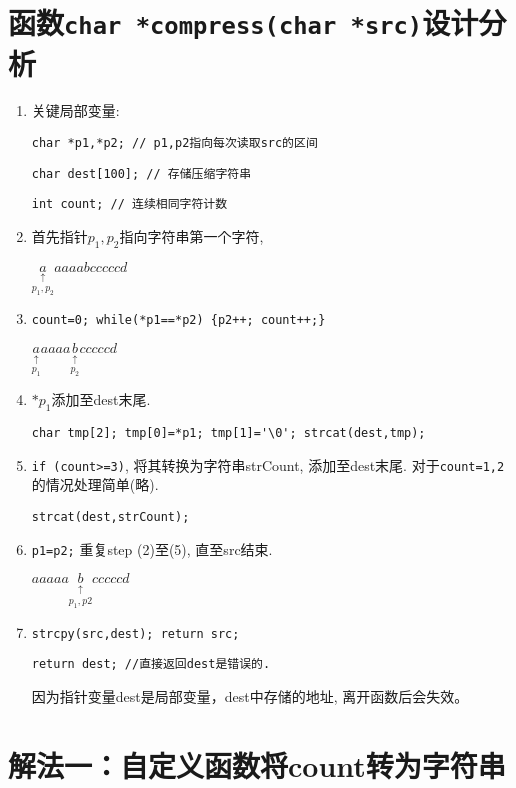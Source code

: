 \section{函数\lstinline|char *compress(char *src)|设计分析}

\begin{enumerate}[(1)]
	\item 关键局部变量:
	
	 \lstinline|char *p1,*p2; // p1,p2指向每次读取src的区间| 
	
	 \lstinline|char dest[100]; // 存储压缩字符串| 
	 
	 \lstinline|int count; // 连续相同字符计数| 
	
	\item 首先指针$p_1,p_2$指向字符串第一个字符, 
	
	$\underset{p_1,p_2}{\underset{\uparrow}{a}}aaaabcccccd$
	
	\item \lstinline|count=0; while(*p1==*p2) {p2++; count++;}|
	
	$\underset{p_1}{\underset{\uparrow}{a}}aaaa\underset{p_2}{\underset{\uparrow}{b}}cccccd$
	
	\item $*p_1$添加至dest末尾.
	
	\lstinline|char tmp[2]; tmp[0]=*p1; tmp[1]='\0'; strcat(dest,tmp);|
	
	\item \lstinline|if (count>=3)|, 将其转换为字符串strCount, 添加至dest末尾. 对于\lstinline|count=1,2|的情况处理简单(略).
	
	\lstinline|strcat(dest,strCount);|
	
	\item \lstinline|p1=p2;| 重复step (2)至(5), 直至src结束.
	
	$aaaaa\underset{p_1,p2}{\underset{\uparrow}{b}}cccccd$ 
	
	\item \lstinline|strcpy(src,dest); return src;| 
	
	 \lstinline|return dest; //直接返回dest是错误的.| 
	 
	 因为指针变量dest是局部变量，dest中存储的地址, 离开函数后会失效。 
	  
\end{enumerate}



\section{解法一：自定义函数将count转为字符串}

